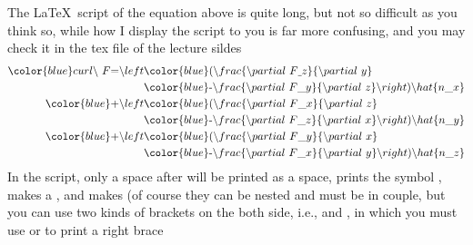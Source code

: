 \documentclass{beamer}
\begin{document}
\begin{frame}
	The \LaTeX\ script of the equation above is quite long, but not so difficult as you think so, while how I display the script to you is far more confusing, and you may check it in the tex file of the lecture sildes
	\begin{align*}
	\color{blue} curl\backslash\ F
	\text{=}\backslash left & \color{blue} (\backslash frac\{\backslash partial\ F\uline{\ }z\}\{\backslash partial\ y\}\\
	& \color{blue} \text{-}\backslash frac\{\backslash partial\ F\_y\}\{\backslash partial\ z\}\backslash right)\backslash hat\{n\_x\}\\
	\color{blue} \text{+}\backslash left & \color{blue} (\backslash frac\{\backslash partial\ F\_x\}\{\backslash partial\ z\}\\
	& \color{blue} \text{-}\backslash frac\{\backslash partial\ F\_z\}\{\backslash partial\ x\}\backslash right)\backslash hat\{n\_y\}\\
	\color{blue} \text{+}\backslash left & \color{blue} (\backslash frac\{\backslash partial\ F\_y\}\{\backslash partial\ x\}\\
	& \color{blue} \text{-}\backslash frac\{\backslash partial\ F\_x\}\{\backslash partial\ y\}\backslash right)\backslash hat\{n\_z\}
	\end{align*}
	In the script, only a space after \structure{\textbackslash} will be printed as a space,  prints the symbol \structure{$\partial$},  makes a ,  and  makes  (of course they can be nested and must be in couple, but you can use two kinds of brackets on the both side, i.e., \structure{\textbackslash left[} and , in which you must use  or \structure{\textbackslash \}} to print a right brace \structure{$\rbrace$} \\
\end{frame}
\end{document}
